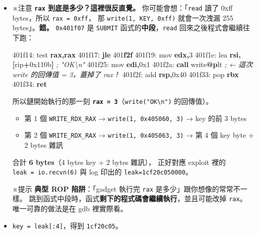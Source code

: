 \documentclass[10pt,a4paper]{article}
\newenvironment{Shaded}{\begin{snugshade}}{\end{snugshade}}
\newcommand{\BaseNTok}[1]{\textcolor[rgb]{0.00,0.00,0.81}{#1}}
\newcommand{\BuiltInTok}[1]{#1}
\newcommand{\CommentTok}[1]{\textcolor[rgb]{0.56,0.35,0.01}{\textit{#1}}}
\newcommand{\ControlFlowTok}[1]{\textcolor[rgb]{0.13,0.29,0.53}{\textbf{#1}}}
\newcommand{\DecValTok}[1]{\textcolor[rgb]{0.00,0.00,0.81}{#1}}
\newcommand{\ErrorTok}[1]{\textcolor[rgb]{0.64,0.00,0.00}{\textbf{#1}}}
\newcommand{\FunctionTok}[1]{\textcolor[rgb]{0.13,0.29,0.53}{\textbf{#1}}}
\newcommand{\KeywordTok}[1]{\textcolor[rgb]{0.13,0.29,0.53}{\textbf{#1}}}
\newcommand{\NormalTok}[1]{#1}
\newcommand{\OperatorTok}[1]{\textcolor[rgb]{0.81,0.36,0.00}{\textbf{#1}}}
\renewenvironment{Shaded}{%
  \def\FrameCommand{\fboxsep=3.2pt\colorbox{shadecolor}}%
  \MakeFramed{\advance\hsize-\width\FrameRestore\small}%
}{%
  \endMakeFramed
}
\providecommand{\tightlist}{%
  \setlength{\itemsep}{0pt}\setlength{\parskip}{0pt}}
\renewenvironment{quote}{%
  \begin{mdframed}[linewidth=0pt,innerleftmargin=0pt,innerrightmargin=0pt,
    innerbottommargin=0pt,innertopmargin=0pt,skipabove=0.55em,skipbelow=0.55em,
    leftmargin=0.9em,rightmargin=0.4em,startcode={\color{quotebar}\vrule width 2.6pt},%
    endcode={}]%
  \itshape\color{black}%
}{%
  \end{mdframed}%
}
\begin{document}
\begin{itemize}
\item
  ※注意 \textbf{\texttt{rax} 到底是多少？這裡很反直覺。}
  你可能會想：「\texttt{read} 讀了 0xff bytes，所以
  \texttt{rax\ \allowbreak{}=\ \allowbreak{}0xff}， 那 \texttt{write(1,\allowbreak{}\ \allowbreak{}KEY,\allowbreak{}\ \allowbreak{}0xff)} 就會一次洩漏
  255 bytes」。\textbf{錯。} \texttt{0x401f07} 是 \texttt{SUBMIT}
  函式的\textbf{中段}，\texttt{read} 回來之後程式會繼續往下跑：

\begin{Shaded}
\begin{Highlighting}[]
\NormalTok{401f14:  }\BuiltInTok{test} \KeywordTok{rax}\OperatorTok{,}\KeywordTok{rax}
\NormalTok{401f17:  }\ControlFlowTok{jle}  \DecValTok{401}\ErrorTok{f2f}
\NormalTok{401f19:  }\BuiltInTok{mov}  \KeywordTok{edx}\OperatorTok{,}\DecValTok{3}
\NormalTok{401f1e:  }\BuiltInTok{lea}  \KeywordTok{rsi}\OperatorTok{,[}\NormalTok{rip}\OperatorTok{+}\BaseNTok{0x110b}\OperatorTok{]}      \CommentTok{; "OK\textbackslash{}n"}
\NormalTok{401f25:  }\BuiltInTok{mov}  \KeywordTok{edi}\OperatorTok{,}\BaseNTok{0x1}
\NormalTok{401f2a:  }\ControlFlowTok{call}\NormalTok{ write}\FunctionTok{@}\ErrorTok{p}\NormalTok{lt             }\CommentTok{; ← 這次 write 的回傳值 = 3，蓋掉了 rax！}
\NormalTok{401f2f:  }\BuiltInTok{add}  \KeywordTok{rsp}\OperatorTok{,}\BaseNTok{0x40}
\NormalTok{401f33:  }\BuiltInTok{pop}  \KeywordTok{rbx}
\NormalTok{401f34:  }\ControlFlowTok{ret}
\end{Highlighting}
\end{Shaded}

  所以鏈開始執行的那一刻
  \textbf{\texttt{rax\ \allowbreak{}=\ \allowbreak{}3}}（\texttt{write("OK\textbackslash{}\allowbreak{}n")}
  的回傳值）。

  \begin{itemize}
  \tightlist
  \item
    第 1 個 \texttt{WRITE\_\allowbreak{}RDX\_\allowbreak{}RAX} → \texttt{write(1,\allowbreak{}\ \allowbreak{}0x405060,\allowbreak{}\ \allowbreak{}3)}
    → key 的前 3 bytes
  \item
    第 2 個 \texttt{WRITE\_\allowbreak{}RDX\_\allowbreak{}RAX} → \texttt{write(1,\allowbreak{}\ \allowbreak{}0x405063,\allowbreak{}\ \allowbreak{}3)}
    → 第 4 個 key byte + 2 bytes 雜訊
  \end{itemize}

  合計 \textbf{6 bytes}（4 bytes key + 2 bytes 雜訊）， 正好對應 exploit
  裡的 \texttt{leak\ \allowbreak{}=\ \allowbreak{}io.\allowbreak{}recvn(6)} 與 log 印出的
  \texttt{leak=1cf20c050000}。

  \begin{quote}
  ※提示 \textbf{典型 ROP 陷阱}：「gadget 執行完 \texttt{rax}
  是多少」跟你想像的常常不一樣。
  跳到函式中段時，函式\textbf{剩下的程式碼會繼續執行}，並且可能改掉
  \texttt{rax}。 唯一可靠的做法是在 gdb 裡實際看。
  \end{quote}
\item
  \texttt{key\ \allowbreak{}=\ \allowbreak{}leak{[}:\allowbreak{}4{]}}，得到 \texttt{1cf20c05}。
\end{itemize}
\end{document}

